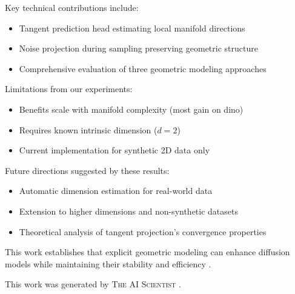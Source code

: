 \documentclass[final]{iclr2024_conference}
\begin{document}
Key technical contributions include:
\begin{itemize}
    \item Tangent prediction head estimating local manifold directions
    \item Noise projection during sampling preserving geometric structure
    \item Comprehensive evaluation of three geometric modeling approaches
\end{itemize}

Limitations from our experiments:
\begin{itemize}
    \item Benefits scale with manifold complexity (most gain on dino)
    \item Requires known intrinsic dimension ($d=2$)
    \item Current implementation for synthetic 2D data only
\end{itemize}

Future directions suggested by these results:
\begin{itemize}
    \item Automatic dimension estimation for real-world data
    \item Extension to higher dimensions and non-synthetic datasets
    \item Theoretical analysis of tangent projection's convergence properties
\end{itemize}

This work establishes that explicit geometric modeling can enhance diffusion models while maintaining their stability and efficiency \citep{ddpm,pmlr-v37-sohl-dickstein15}.

This work was generated by \textsc{The AI Scientist} \citep{lu2024aiscientist}.



\end{document}
